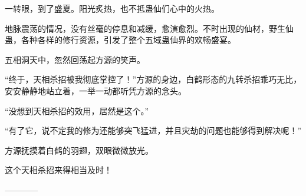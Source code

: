 \begin{this_body}
一转眼，到了盛夏。阳光炙热，也不抵蛊仙们心中的火热。

地脉震荡的情况，没有丝毫的停息和减缓，愈演愈烈。不时出现的仙材，野生仙蛊，各种各样的修行资源，引发了整个五域蛊仙界的欢畅盛宴。

五相洞天中，忽然回荡起方源的笑声。

“终于，天相杀招被我彻底掌控了！”方源的身边，白鹤形态的九转杀招乖巧无比，安安静静地站立着，一举一动都听凭方源的念头。

“没想到天相杀招的效用，居然是这个。”

“有了它，说不定我的修为还能够突飞猛进，并且灾劫的问题也能够得到解决呢！”

方源抚摸着白鹤的羽翅，双眼微微放光。

这个天相杀招来得相当及时！

------------

\end{this_body}

